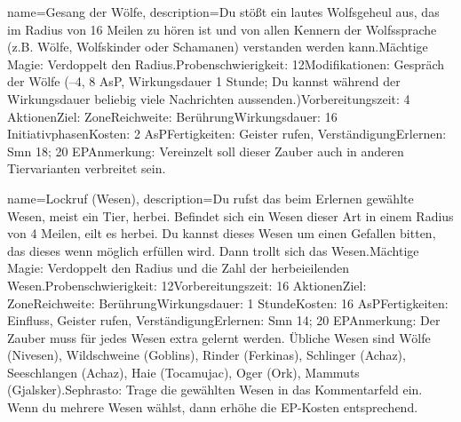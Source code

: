 {
    name={Gesang der Wölfe},
    description={Du stößt ein lautes Wolfsgeheul aus, das im Radius von 16 Meilen zu hören ist und von allen Kennern der Wolfssprache (z.B. Wölfe, Wolfskinder oder Schamanen) verstanden werden kann.\newline Mächtige Magie: Verdoppelt den Radius.\newline Probenschwierigkeit: 12\newline Modifikationen: Gespräch der Wölfe (–4, 8 AsP, Wirkungsdauer 1 Stunde; Du kannst während der Wirkungsdauer beliebig viele Nachrichten aussenden.)\newline Vorbereitungszeit: 4 Aktionen\newline Ziel: Zone\newline Reichweite: Berührung\newline Wirkungsdauer: 16 Initiativphasen\newline Kosten: 2 AsP\newline Fertigkeiten: Geister rufen, Verständigung\newline Erlernen: Smn 18; 20 EP\newline Anmerkung: Vereinzelt soll dieser Zauber auch in anderen Tiervarianten verbreitet sein.}
}


{
    name={Lockruf (Wesen)},
    description={Du rufst das beim Erlernen gewählte Wesen, meist ein Tier, herbei. Befindet sich ein Wesen dieser Art in einem Radius von 4 Meilen, eilt es herbei. Du kannst dieses Wesen um einen Gefallen bitten, das dieses wenn möglich erfüllen wird. Dann trollt sich das Wesen.\newline Mächtige Magie: Verdoppelt den Radius und die Zahl der herbeieilenden Wesen.\newline Probenschwierigkeit: 12\newline Vorbereitungszeit: 16 Aktionen\newline Ziel: Zone\newline Reichweite: Berührung\newline Wirkungsdauer: 1 Stunde\newline Kosten: 16 AsP\newline Fertigkeiten: Einfluss, Geister rufen, Verständigung\newline Erlernen: Smn 14; 20 EP\newline Anmerkung: Der Zauber muss für jedes Wesen extra gelernt werden. Übliche Wesen sind Wölfe (Nivesen), Wildschweine (Goblins), Rinder (Ferkinas), Schlinger (Achaz), Seeschlangen (Achaz), Haie (Tocamujac), Oger (Ork), Mammuts (Gjalsker).\newline Sephrasto: Trage die gewählten Wesen in das Kommentarfeld ein. Wenn du mehrere Wesen wählst, dann erhöhe die EP-Kosten entsprechend.}
}


